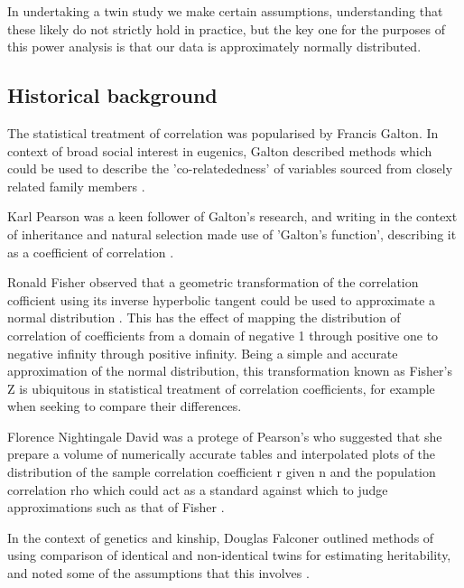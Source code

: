 In undertaking a twin study we make certain assumptions, understanding that these likely do not strictly hold in practice, but the key one for the purposes of this power analysis is that our data is approximately normally distributed.

\subsection{Historical background}

The statistical treatment of correlation was popularised by Francis Galton.  In context of broad social interest in eugenics, Galton described methods which could be used to describe the 'co-relatededness' of variables sourced from closely related family members \cite{Galton1888,Galton1890}.  

Karl Pearson was a keen follower of Galton's research, and writing in the context of inheritance and natural selection made use of 'Galton's function', describing it as a coefficient of correlation \cite{Pearson1895}.  

Ronald Fisher observed that a geometric transformation of the correlation cofficient using its inverse hyperbolic tangent could be used to approximate a normal distribution \cite{Fisher1915}.  This has the effect of mapping the distribution of correlation of coefficients from a domain of negative 1 through positive one to negative infinity through positive infinity. Being a simple and accurate approximation of the normal distribution, this transformation known as Fisher's Z is ubiquitous in statistical treatment of correlation coefficients, for example when seeking to compare their differences.

Florence Nightingale David was a protege of Pearson's who suggested that she prepare a volume of numerically accurate tables and interpolated plots of the distribution of the sample correlation coefficient r given n and the population correlation rho which could act as a standard against which to judge approximations such as that of Fisher \cite{David1938}. 

In the context of genetics and kinship, Douglas Falconer outlined methods of using comparison of identical and non-identical twins for estimating heritability, and noted some of the assumptions that this involves \cite{Falconer1960}.

